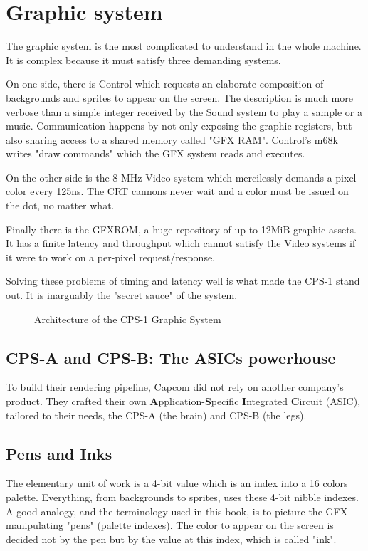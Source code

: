 \section{Graphic system}

The graphic system is the most complicated to understand in the whole machine. It is complex because it must satisfy three demanding systems.



On one side, there is Control which requests an elaborate composition of backgrounds and sprites to appear on the screen. The description is much more verbose than a simple integer received by the Sound system to play a sample or a music. Communication happens by not only exposing the graphic registers, but also sharing access to a shared memory called "GFX RAM". Control's m68k writes "draw commands" which the GFX system reads and executes.

On the other side is the 8 MHz Video system which mercilessly demands a pixel color every 125ns. The CRT cannons never wait and a color must be issued on the dot, no matter what. 

Finally there is the GFXROM, a huge repository of up to 12MiB graphic assets. It has a finite latency and throughput which cannot satisfy the Video systems if it were to work on a per-pixel request/response.

Solving these problems of timing and latency well is what made the CPS-1 stand out. It is inarguably the "secret sauce" of the system. 

\begin{figure}[H]
\caption*{Architecture of the CPS-1 Graphic System}
\end{figure}


\subsection{CPS-A and CPS-B: The ASICs powerhouse}
To build their rendering pipeline, Capcom did not rely on another company's product. They crafted their own \textbf{A}pplication-\textbf{S}pecific \textbf{I}ntegrated \textbf{C}ircuit (ASIC), tailored to their needs, the CPS-A (the brain) and CPS-B (the legs).





\subsection{Pens and Inks}
The elementary unit of work is a 4-bit value which is an index into a 16 colors palette. Everything, from backgrounds to sprites, uses these 4-bit nibble indexes. A good analogy, and the terminology used in this book, is to picture the GFX manipulating "pens" (palette indexes). The color to appear on the screen is decided not by the pen but by the value at this index, which is called "ink".

